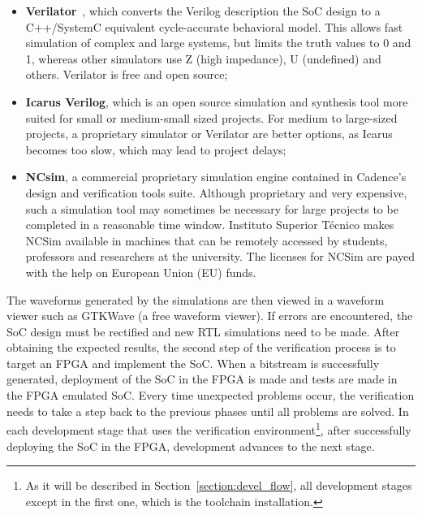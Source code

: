 \begin{itemize}
	\item \textbf{Verilator}~\cite{bib:verilator}, which converts the Verilog description the SoC design to a C++/SystemC equivalent cycle-accurate behavioral model. This allows fast simulation of complex and large systems, but limits the truth values to 0 and 1, whereas other simulators use Z (high impedance), U (undefined) and others. Verilator is free and open source;
	
	\item \textbf{Icarus Verilog}, which is an open source simulation and synthesis tool more suited for small or medium-small sized projects. For medium to large-sized projects, a proprietary simulator or Verilator are better options, as Icarus becomes too slow, which may lead to project delays;
	
	\item \textbf{NCsim}, a commercial proprietary simulation engine contained in Cadence's design and verification tools suite. Although proprietary and very expensive, such a simulation tool may sometimes be necessary for large projects to be completed in a reasonable time window. Instituto Superior T\'{e}cnico makes NCSim available in machines that can be remotely accessed by students, professors and researchers at the university. The licenses for NCSim are payed with the help on European Union (EU) funds.
\end{itemize}

The waveforms generated by the simulations are then viewed in a waveform viewer such as GTKWave (a free waveform viewer). If errors are encountered, the SoC design must be rectified and new RTL simulations need to be made. After obtaining the expected results, the second step of the verification process is to target an FPGA and implement the SoC. When a bitstream is successfully generated, deployment of the SoC in the FPGA is made and tests are made in the FPGA emulated SoC. Every time unexpected problems occur, the verification needs to take a step back to the previous phases until all problems are solved. In each development stage that uses the verification environment\footnote{As it will be described in Section~\ref{section:devel_flow}, all development stages except in the first one, which is the toolchain installation.}, after successfully deploying the SoC in the FPGA, development advances to the next stage.

